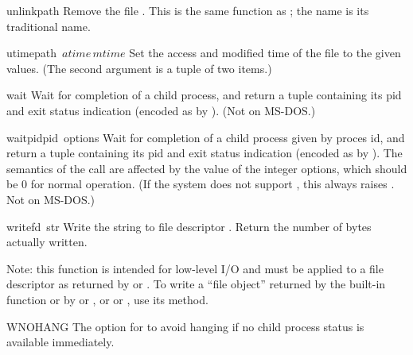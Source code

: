 \begin{funcdesc}{unlink}{path}
Remove the file .  This is the same function as ;
the  name is its traditional \UNIX{} name.
\end{funcdesc}

\begin{funcdesc}{utime}{path\, \(atime\, mtime\)}
Set the access and modified time of the file to the given values.
(The second argument is a tuple of two items.)
\end{funcdesc}

\begin{funcdesc}{wait}{}
Wait for completion of a child process, and return a tuple containing
its pid and exit status indication (encoded as by \UNIX{}).
(Not on MS-DOS.)
\end{funcdesc}

\begin{funcdesc}{waitpid}{pid\, options}
Wait for completion of a child process given by proces id, and return
a tuple containing its pid and exit status indication (encoded as by
\UNIX{}).  The semantics of the call are affected by the value of
the integer options, which should be 0 for normal operation.  (If the
system does not support , this always raises
.  Not on MS-DOS.)
\end{funcdesc}

\begin{funcdesc}{write}{fd\, str}
Write the string  to file descriptor .
Return the number of bytes actually written.

Note: this function is intended for low-level I/O and must be applied
to a file descriptor as returned by  or
.  To write a ``file object'' returned by the
built-in function  or by  or
, or  or , use
its  method.
\end{funcdesc}

\begin{datadesc}{WNOHANG}
The option for  to avoid hanging if no child process
status is available immediately.
\end{datadesc}



